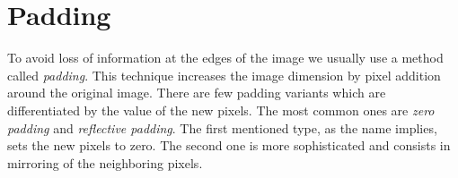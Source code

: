 \section{Padding}\label{sec:padding}
To avoid loss of information at the edges of the image we usually use a method called \textit{padding}.
This technique increases the image dimension by pixel addition around the original image.
There are few padding variants which are differentiated by the value of the new pixels.
The most common ones are \textit{zero padding} and \textit{reflective padding}.
The first mentioned type, as the name implies, sets the new pixels to zero.
The second one is more sophisticated and consists in mirroring of the neighboring pixels.


